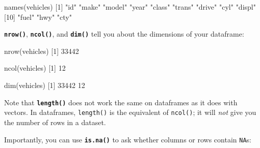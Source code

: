 \documentclass[
]{book}
\newenvironment{Shaded}{\begin{snugshade}}{\end{snugshade}}
\newcommand{\DecValTok}[1]{\textcolor[rgb]{0.00,0.00,0.81}{#1}}
\newcommand{\FunctionTok}[1]{\textcolor[rgb]{0.00,0.00,0.00}{#1}}
\newcommand{\NormalTok}[1]{#1}
\newcommand{\StringTok}[1]{\textcolor[rgb]{0.31,0.60,0.02}{#1}}
\begin{document}
\begin{Shaded}
\begin{Highlighting}[]
\FunctionTok{names}\NormalTok{(vehicles) }
\NormalTok{ [}\DecValTok{1}\NormalTok{] }\StringTok{"id"}    \StringTok{"make"}  \StringTok{"model"} \StringTok{"year"}  \StringTok{"class"} \StringTok{"trans"} \StringTok{"drive"} \StringTok{"cyl"}   \StringTok{"displ"}
\NormalTok{[}\DecValTok{10}\NormalTok{] }\StringTok{"fuel"}  \StringTok{"hwy"}   \StringTok{"cty"}  
\end{Highlighting}
\end{Shaded}

\textbf{\texttt{nrow()}}, \textbf{\texttt{ncol()}}, and \textbf{\texttt{dim()}} tell you about the dimensions of your dataframe:

\begin{Shaded}
\begin{Highlighting}[]
\FunctionTok{nrow}\NormalTok{(vehicles) }
\NormalTok{[}\DecValTok{1}\NormalTok{] }\DecValTok{33442}
\end{Highlighting}
\end{Shaded}

\begin{Shaded}
\begin{Highlighting}[]
\FunctionTok{ncol}\NormalTok{(vehicles) }
\NormalTok{[}\DecValTok{1}\NormalTok{] }\DecValTok{12}
\end{Highlighting}
\end{Shaded}

\begin{Shaded}
\begin{Highlighting}[]
\FunctionTok{dim}\NormalTok{(vehicles) }
\NormalTok{[}\DecValTok{1}\NormalTok{] }\DecValTok{33442}    \DecValTok{12}
\end{Highlighting}
\end{Shaded}

Note that \textbf{\texttt{length()}} does not work the same on dataframes as it does with vectors. In dataframes, \texttt{length()} is the equivalent of \texttt{ncol()}; it will \emph{not} give you the number of rows in a dataset.

Importantly, you can use \textbf{\texttt{is.na()}} to ask whether columns or rows contain \texttt{NA}s:
\end{document}
